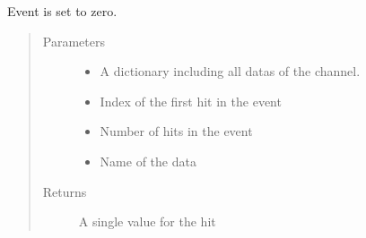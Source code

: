 \documentclass[letterpaper,10pt,english]{sphinxmanual}
\begin{document}

\begin{fulllineitems}
\label{\detokenize{autodocs/data:listmode.data.kill_combinator}}
\sphinxAtStartPar
Event is set to zero.
\begin{quote}\begin{description}
\item[{Parameters}] \leavevmode\begin{itemize}
\item {} 
\sphinxAtStartPar
{} \textendash{} A dictionary including all datas of the channel.

\item {} 
\sphinxAtStartPar
{} \textendash{} Index of the first hit in the event

\item {} 
\sphinxAtStartPar
{} \textendash{} Number of hits in the event

\item {} 
\sphinxAtStartPar
{} \textendash{} Name of the data

\end{itemize}

\item[{Returns}] \leavevmode
\sphinxAtStartPar
A single value for the hit

\end{description}\end{quote}

\end{fulllineitems}

\end{document}
